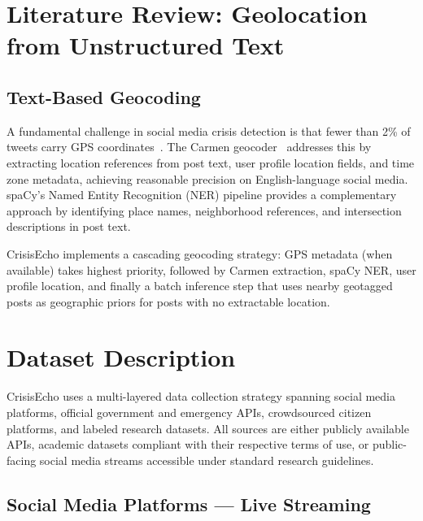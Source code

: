 \documentclass[conference]{IEEEtran}
\begin{document}
\section{Literature Review: Geolocation from Unstructured Text}

\subsection{Text-Based Geocoding}

A fundamental challenge in social media crisis detection is that fewer than 2\%
of tweets carry GPS coordinates~\cite{middleton2014real}. The Carmen
geocoder~\cite{dredze2013carmen} addresses this by extracting location
references from post text, user profile location fields, and time zone
metadata, achieving reasonable precision on English-language social media.
spaCy's Named Entity Recognition (NER) pipeline provides a complementary
approach by identifying place names, neighborhood references, and
intersection descriptions in post text.

CrisisEcho implements a cascading geocoding strategy: GPS metadata (when
available) takes highest priority, followed by Carmen extraction, spaCy NER,
user profile location, and finally a batch inference step that uses nearby
geotagged posts as geographic priors for posts with no extractable location.

\section{Dataset Description}

CrisisEcho uses a multi-layered data collection strategy spanning social media
platforms, official government and emergency APIs, crowdsourced citizen platforms,
and labeled research datasets. All sources are either publicly available APIs,
academic datasets compliant with their respective terms of use, or public-facing
social media streams accessible under standard research guidelines.

\subsection{Social Media Platforms --- Live Streaming}
\end{document}
